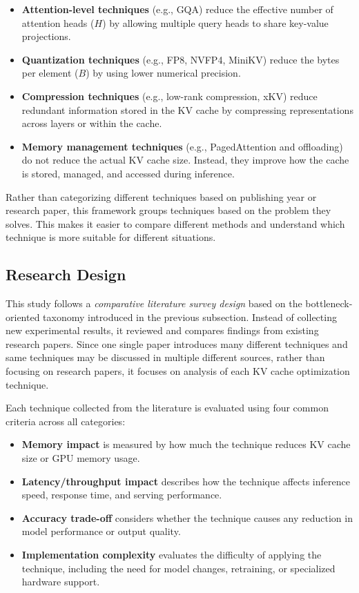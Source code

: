 \documentclass[conference]{IEEEtran}
\begin{document}
\begin{itemize}
	\item \textbf{Attention-level techniques} (e.g., GQA) reduce the effective number of attention heads ($H$) by allowing multiple query heads to share key-value projections.

	\item \textbf{Quantization techniques} (e.g., FP8, NVFP4, MiniKV) reduce the bytes per element ($B$) by using lower numerical precision.

	\item \textbf{Compression techniques} (e.g., low-rank compression, xKV) reduce redundant information stored in the KV cache by compressing representations across layers or within the cache.

	\item \textbf{Memory management techniques} (e.g., PagedAttention and offloading) do not reduce the actual KV cache size. Instead, they improve how the cache is stored, managed, and accessed during inference.
\end{itemize}

Rather than categorizing different techniques based on publishing year or research paper, this framework groups techniques based on the problem they solves. This makes it easier to compare different methods and understand which technique is more suitable for different situations.

\subsection{Research Design}

This study follows a \textit{comparative literature survey design} based on the bottleneck-oriented taxonomy introduced in the previous subsection. Instead of collecting new experimental results, it reviewed and compares findings from existing research papers. Since one single paper introduces many different techniques and same techniques may be discussed in multiple different sources, rather than focusing on research papers, it focuses on analysis of each KV cache optimization technique.

Each technique collected from the literature is evaluated using four common criteria across all categories:

\begin{itemize}
	\item \textbf{Memory impact} is measured by how much the technique reduces KV cache size or GPU memory usage.
	\item \textbf{Latency/throughput impact} describes how the technique affects inference speed, response time, and serving performance.
	\item \textbf{Accuracy trade-off} considers whether the technique causes any reduction in model performance or output quality.
	\item \textbf{Implementation complexity} evaluates the difficulty of applying the technique, including the need for model changes, retraining, or specialized hardware support.
\end{itemize}
\end{document}
